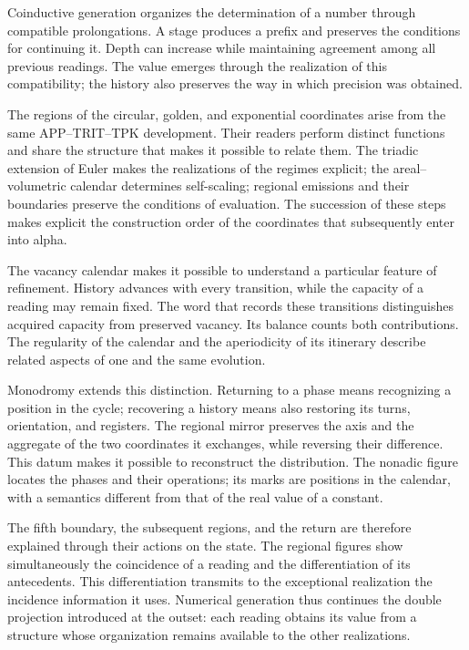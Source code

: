 
Coinductive generation organizes the determination of a number through
compatible prolongations. A stage produces a prefix and preserves the
conditions for continuing it. Depth can increase while maintaining agreement
among all previous readings. The value emerges through the realization of
this compatibility; the history also preserves the way in which precision
was obtained.

The regions of the circular, golden, and exponential coordinates arise from
the same APP--TRIT--TPK development. Their readers perform distinct functions
and share the structure that makes it possible to relate them. The triadic
extension of Euler makes the realizations of the regimes explicit; the
areal--volumetric calendar determines self-scaling; regional emissions and
their boundaries preserve the conditions of evaluation. The succession of
these steps makes explicit the construction order of the coordinates that
subsequently enter into alpha.

The vacancy calendar makes it possible to understand a particular feature of
refinement. History advances with every transition, while the capacity of a
reading may remain fixed. The word that records these transitions
distinguishes acquired capacity from preserved vacancy. Its balance counts
both contributions. The regularity of the calendar and the aperiodicity of
its itinerary describe related aspects of one and the same evolution.

Monodromy extends this distinction. Returning to a phase means recognizing a
position in the cycle; recovering a history means also restoring its turns,
orientation, and registers. The regional mirror preserves the axis and the
aggregate of the two coordinates it exchanges, while reversing their
difference. This datum makes it possible to reconstruct the distribution.
The nonadic figure locates the phases and their operations; its marks are
positions in the calendar, with a semantics different from that of the real
value of a constant.

The fifth boundary, the subsequent regions, and the return are therefore
explained through their actions on the state. The regional figures show
simultaneously the coincidence of a reading and the differentiation of its
antecedents. This differentiation transmits to the exceptional realization
the incidence information it uses. Numerical generation thus continues the
double projection introduced at the outset: each reading obtains its value
from a structure whose organization remains available to the other
realizations.
